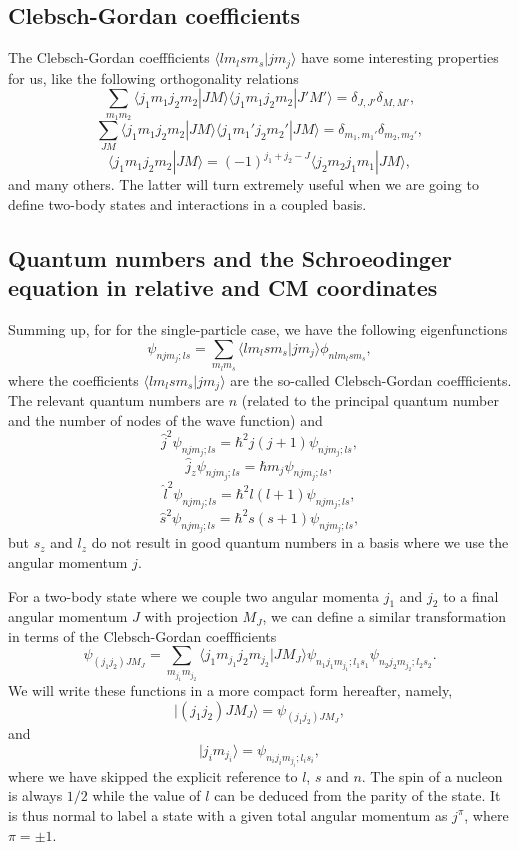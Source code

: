 \documentclass[graybox,sectrefs,envcountresetchap,open=right]{svmonodo}
\begin{document}
\subsection{Clebsch-Gordan coefficients}

The Clebsch-Gordan coeffficients $\langle lm_lsm_s|jm_j\rangle$ have some interesting properties for us, like the following  orthogonality relations
\[
\sum_{m_1m_2}\langle j_1m_1j_2m_2|JM\rangle\langle j_1m_1j_2m_2|J'M'\rangle=\delta_{J,J'}\delta_{M,M'},
\]
\[
\sum_{JM}\langle j_1m_1j_2m_2|JM\rangle\langle j_1m_1'j_2m_2'|JM\rangle=\delta_{m_1,m_1'}\delta_{m_2,m_2'},
\]
\[
\langle j_1m_1j_2m_2|JM\rangle=(-1)^{j_1+j_2-J}\langle j_2m_2j_1m_1|JM\rangle,
\]
and many others. The latter will turn extremely useful when we are going to define two-body states and interactions in a coupled basis.



\subsection{Quantum numbers and the Schroeodinger equation in relative and CM coordinates}

Summing up, for 
for the single-particle case, we have the following eigenfunctions 
\[
\psi_{njm_j;ls}=\sum_{m_lm_s}\langle lm_lsm_s|jm_j\rangle\phi_{nlm_lsm_s},
\]
where the coefficients $\langle lm_lsm_s|jm_j\rangle$ are the so-called Clebsch-Gordan coeffficients.
The relevant quantum numbers are $n$ (related to the principal quantum number and the number of nodes of the wave function) and 
\[
   \hat{j}^2\psi_{njm_j;ls}=\hbar^2j(j+1)\psi_{njm_j;ls},
\]
\[
   \hat{j}_z\psi_{njm_j;ls}=\hbar m_j\psi_{njm_j;ls},
\]
\[
   \hat{l}^2\psi_{njm_j;ls}=\hbar^2l(l+1)\psi_{njm_j;ls},
\]
\[
   \hat{s}^2\psi_{njm_j;ls}=\hbar^2s(s+1)\psi_{njm_j;ls},
\]
but $s_z$ and $l_z$ do not result in good quantum numbers in a basis where we
use the angular momentum $j$.


For a two-body state where we couple two angular momenta $j_1$ and $j_2$ to a final
angular momentum $J$ with projection $M_J$, we can define a similar transformation in terms
of the Clebsch-Gordan coeffficients
\[
\psi_{(j_1j_2)JM_J}=\sum_{m_{j_1}m_{j_2}}\langle j_1m_{j_1}j_2m_{j_2}|JM_J\rangle\psi_{n_1j_1m_{j_1};l_1s_1}\psi_{n_2j_2m_{j_2};l_2s_2}.
\]
We will write these functions in a more compact form hereafter, namely,
\[
|(j_1j_2)JM_J\rangle=\psi_{(j_1j_2)JM_J},
\]
and
\[
|j_im_{j_i}\rangle=\psi_{n_ij_im_{j_i};l_is_i},
\]
where we have skipped the explicit reference to $l$, $s$ and $n$. The spin of a nucleon is always $1/2$ while the value of $l$ can be deduced from the parity of the state.
It is thus normal to label a state with a given total angular momentum as 
$j^{\pi}$, where $\pi=\pm 1$. 
\end{document}
